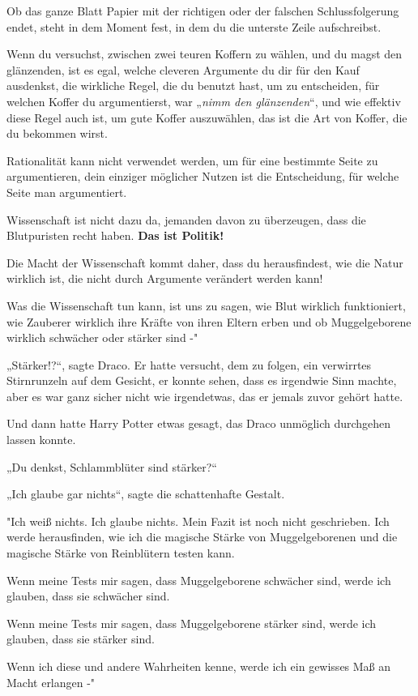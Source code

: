 {Ob das ganze Blatt Papier mit der richtigen oder der falschen Schlussfolgerung endet, steht in dem Moment fest, in dem du die unterste Zeile aufschreibst.

Wenn du versuchst, zwischen zwei teuren Koffern zu wählen, und du magst den glänzenden, ist es egal, welche cleveren Argumente du dir für den Kauf ausdenkst, die wirkliche Regel, die du benutzt hast, um zu entscheiden, für welchen Koffer du argumentierst, war „\emph{nimm den glänzenden}“, und wie effektiv diese Regel auch ist, um gute Koffer auszuwählen, das ist die Art von Koffer, die du bekommen wirst.

Rationalität kann nicht verwendet werden, um für eine bestimmte Seite zu argumentieren, dein einziger möglicher Nutzen ist die Entscheidung, für welche Seite man argumentiert.

Wissenschaft ist nicht dazu da, jemanden davon zu überzeugen, dass die Blutpuristen recht haben. \textbf{Das ist Politik!}

Die Macht der Wissenschaft kommt daher, dass du herausfindest, wie die Natur wirklich ist, die nicht durch Argumente verändert werden kann!

Was die Wissenschaft tun kann, ist uns zu sagen, wie Blut wirklich funktioniert, wie Zauberer wirklich ihre Kräfte von ihren Eltern erben und ob Muggelgeborene wirklich schwächer oder stärker sind -"

„Stärker!?“, sagte Draco. Er hatte versucht, dem zu folgen, ein verwirrtes Stirnrunzeln auf dem Gesicht, er konnte sehen, dass es irgendwie Sinn machte, aber es war ganz sicher nicht wie irgendetwas, das er jemals zuvor gehört hatte.

Und dann hatte Harry Potter etwas gesagt, das Draco unmöglich durchgehen lassen konnte.

„Du denkst, Schlammblüter sind stärker?“

„Ich glaube gar nichts“, sagte die schattenhafte Gestalt.

"Ich weiß nichts. Ich glaube nichts. Mein Fazit ist noch nicht geschrieben. Ich werde herausfinden, wie ich die magische Stärke von Muggelgeborenen und die magische Stärke von Reinblütern testen kann.

Wenn meine Tests mir sagen, dass Muggelgeborene schwächer sind, werde ich glauben, dass sie schwächer sind.

Wenn meine Tests mir sagen, dass Muggelgeborene stärker sind, werde ich glauben, dass sie stärker sind.

Wenn ich diese und andere Wahrheiten kenne, werde ich ein gewisses Maß an Macht erlangen -"

}

